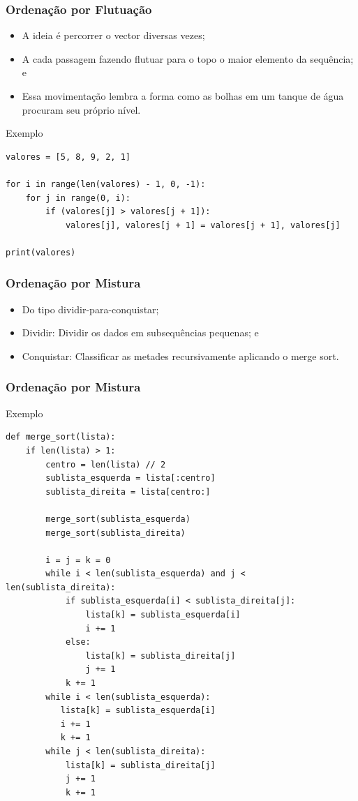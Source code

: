 \documentclass{beamer}
\begin{document}
\begin{frame}[fragile]
\frametitle{Ordenação por Flutuação}

\begin{itemize}
	\item A ideia é percorrer o vector diversas vezes;
	\item A cada passagem fazendo flutuar para o topo o maior elemento da
	sequência; e
	\item Essa movimentação lembra a forma como as bolhas em um tanque de
	água procuram seu próprio nível.
\end{itemize}

\begin{exampleblock}{Exemplo}
	\begin{lstlisting}
valores = [5, 8, 9, 2, 1]

for i in range(len(valores) - 1, 0, -1):
    for j in range(0, i):
        if (valores[j] > valores[j + 1]):
            valores[j], valores[j + 1] = valores[j + 1], valores[j] 

print(valores)
	\end{lstlisting}
\end{exampleblock}
\end{frame}

\begin{frame}
\frametitle{Ordenação por Mistura}

\begin{itemize}
	\item Do tipo dividir-para-conquistar;
	\item Dividir: Dividir os dados em subsequências pequenas; e
	\item Conquistar: Classificar as metades recursivamente aplicando o merge
	sort.
\end{itemize}
\end{frame}

\begin{frame}[fragile]
\frametitle{Ordenação por Mistura}

\begin{exampleblock}{Exemplo}
	\begin{lstlisting}
def merge_sort(lista):
    if len(lista) > 1:
        centro = len(lista) // 2
        sublista_esquerda = lista[:centro]
        sublista_direita = lista[centro:]

        merge_sort(sublista_esquerda)
        merge_sort(sublista_direita)

        i = j = k = 0
        while i < len(sublista_esquerda) and j < len(sublista_direita):
            if sublista_esquerda[i] < sublista_direita[j]:
                lista[k] = sublista_esquerda[i]
                i += 1
            else:
                lista[k] = sublista_direita[j]
                j += 1
            k += 1
        while i < len(sublista_esquerda):
           lista[k] = sublista_esquerda[i]
           i += 1
           k += 1
        while j < len(sublista_direita):
            lista[k] = sublista_direita[j]
            j += 1
            k += 1
	\end{lstlisting}
\end{exampleblock}
\end{frame}
\end{document}
